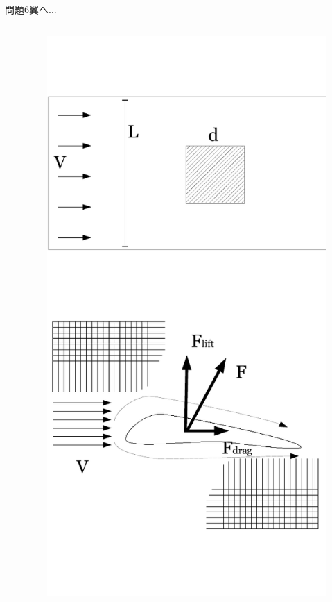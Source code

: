 \documentclass[dvipdfmx]{beamer}
\begin{document}
\begin{frame}{問題6}{翼へ...}
\begin{columns}[t]
\begin{column}{0.7\textwidth}
\end{column}
\begin{column}{0.3\textwidth}
\begin{figure}[htbp]
    \centering
    \includegraphics[bb=0mm 0mm 100.0mm 170.0mm, scale=0.35, type=pdf]{img/problem6.pdf}
\end{figure}
\end{column}
\end{columns}
\end{frame}
\end{document}

